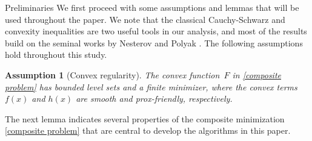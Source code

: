 \documentclass[11pt, a4paper, oneside, reqno]{amsart}
\makeatletter
\newtheorem{assumption}[theorem]{Assumption}
\def\subsection{\@startsection{subsection}{2}%
	\z@{.5\linespacing\@plus.7\linespacing}{.5\linespacing}%
	{\normalfont\large\bfseries}}
\makeatother
\begin{document}
\subsection{Preliminaries}\label{Preliminary}
 We first proceed with some assumptions and lemmas that will be used throughout the paper. We note that the classical Cauchy-Schwarz and convexity inequalities are two useful tools in our analysis, and most of the results build on the seminal works by Nesterov \cite{Nesterov1983} and Polyak \cite{Polyak1969}. The following assumptions hold throughout this study. 
 
\begin{assumption}[Convex regularity]\label{assum2}
The convex function~$F$ in \eqref{composite problem} has bounded level sets and a finite minimizer, where the convex terms~$f(x)$ and $h(x)$ are smooth and prox-friendly, respectively. 
\end{assumption}
The next lemma indicates several properties of the composite minimization \eqref{composite problem} that are central to develop the algorithms in this paper. %
\end{document}
